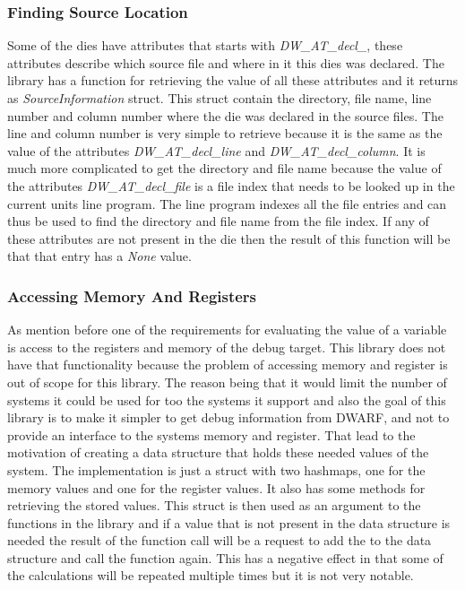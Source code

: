 \subsubsection{Finding Source Location}
Some of the dies have attributes that starts with \emph{DW\_AT\_decl\_}, these attributes describe which source file and where in it this dies was declared.
The library has a function for retrieving the value of all these attributes and it returns as \emph{SourceInformation} struct.
This struct contain the directory, file name, line number and column number where the die was declared in the source files.
The line and column number is very simple to retrieve because it is the same as the value of the attributes \emph{DW\_AT\_decl\_line} and \emph{DW\_AT\_decl\_column}.
It is much more complicated to get the directory and file name because the value of the attributes \emph{DW\_AT\_decl\_file} is a file index that needs to be looked up in the current units line program.
The line program indexes all the file entries and can thus be used to find the directory and file name from the file index.
If any of these attributes are not present in the die then the result of this function will be that that entry has a \emph{None} value.


\subsubsection{Accessing Memory And Registers}
As mention before one of the requirements for evaluating the value of a variable is access to the registers and memory of the debug target.
This library does not have that functionality because the problem of accessing memory and register is out of scope for this library.
The reason being that it would limit the number of systems it could be used for too the systems it support and also the goal of this library is to make it simpler to get debug information from \gls{DWARF}, and not to provide an interface to the systems memory and register.
That lead to the motivation of creating a data structure that holds these needed values of the system.
The implementation is just a struct with two hashmaps, one for the memory values and one for the register values.
It also has some methods for retrieving the stored values.
This struct is then used as an argument to the functions in the library and if a value that is not present in the data structure is needed the result of the function call will be a request to add the to the data structure and call the function again.
This has a negative effect in that some of the calculations will be repeated multiple times but it is not very notable.


